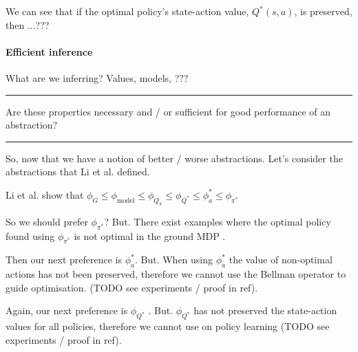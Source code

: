 We can see that if the optimal policy's state-action value, $Q^{* }(s, a)$, is preserved, then ...???

\paragraph{Efficient inference}

What are we inferring? Values, models, ???


\cite{Allen-Zhu2016a}



\begin{center}\rule{0.5\linewidth}{\linethickness}\end{center}
  {\color{red}Are these properties necessary and / or sufficient for good performance of an abstraction?}
\begin{center}\rule{0.5\linewidth}{\linethickness}\end{center}

So, now that we have a notion of better / worse abstractions. Let's consider the abstractions
that Li et al. \cite{Littman2006} defined.

Li et al. \cite{Littman2006} show that $\phi_G \le \phi_{\text{model}} \le \phi_{Q_{\pi}} \le \phi_{Q^{* }} \le \phi_a^{* } \le \phi_{\pi^{* }}$

So we should prefer $\phi_{\pi^{* }}$? But. There exist examples where the
optimal policy found using $\phi_{\pi^{* }}$ is not optimal in the ground MDP \cite{Jong2005}.

Then our next preference is $\phi_a^{* }$. But. When using $\phi_a^{* }$ the value of non-optimal actions has not been preserved,
therefore we cannot use the Bellman operator to guide optimisation. ({\color{red}TODO} see experiments / proof in ref).

Again, our next preference is $\phi_{Q^{* }}$ .
But. $\phi_{Q^{* }}$ has not preserved the state-action values for all policies,
therefore we cannot use on policy learning ({\color{red}TODO} see experiments / proof in ref).



